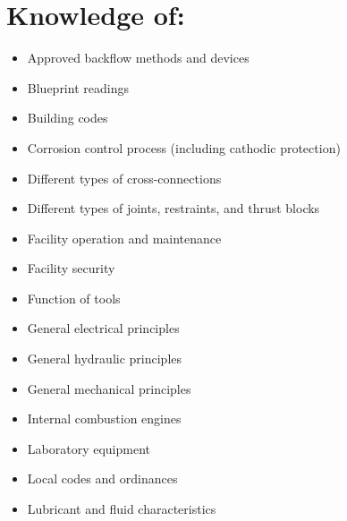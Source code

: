 \documentclass[10pt]{article}
\begin{document}
\section{Knowledge of:}
\begin{itemize}
  \item Approved backflow methods and devices

  \item Blueprint readings

  \item Building codes

  \item Corrosion control process (including cathodic protection)

  \item Different types of cross-connections

  \item Different types of joints, restraints, and thrust blocks

  \item Facility operation and maintenance

  \item Facility security

  \item Function of tools

  \item General electrical principles

  \item General hydraulic principles

  \item General mechanical principles

  \item Internal combustion engines

  \item Laboratory equipment

  \item Local codes and ordinances

  \item Lubricant and fluid characteristics

\end{itemize}
\end{document}
